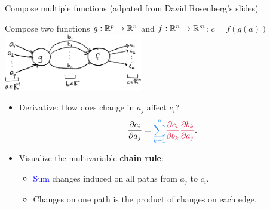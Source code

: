 \documentclass[usenames,dvipsnames,notes,11pt,aspectratio=169,hyperref={colorlinks=true, linkcolor=blue}]{beamer}
\begin{document}
\begin{frame}
{Compose multiple functions}
    {(adpated from David Rosenberg's slides)}

Compose two functions $g:\mathbb{R}^{p}\to\mathbb{R}^{n}$ and $f:\mathbb{R}^{n}\to\mathbb{R}^{m}$: $c=f(g(a))$
\\
\includegraphics[height=2.5cm]{figures/two-fn-comp-graph-partials}
\\

\pause
\begin{itemize}
\item Derivative: How does change in $a_j$ affect $c_i$?
    \pause
$$
\frac{\partial c_{i}}{\partial a_{j}}={\color{blue}\sum_{k=1}^{n}}
{\color{red} \frac{\partial c_{i}}{\partial b_{k}}\frac{\partial b_{k}}{\partial a_{j}}} .
$$
        \vspace{-1em}
\pause
\item Visualize the multivariable \textbf{chain rule}:
\begin{itemize}
\item \textcolor{blue}{Sum} changes induced on all paths from $a_j$ to $c_i$.
\item Changes on one path is the {\color{red}product} of changes on each edge.
\end{itemize} 
\end{itemize}
\end{frame}
\end{document}
